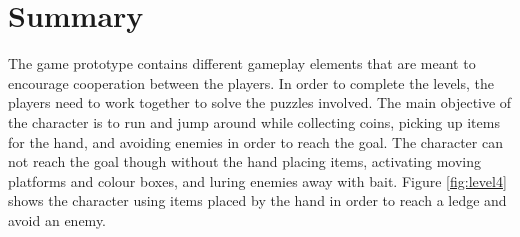 \section{Summary}
The game prototype contains different gameplay elements that are meant to encourage cooperation between the players. In order to complete the levels, the players need to work together to solve the puzzles involved. The main objective of the character is to run and jump around while collecting coins, picking up items for the hand, and avoiding enemies in order to reach the goal. The character can not reach the goal though without the hand placing items, activating moving platforms and colour boxes, and luring enemies away with bait. Figure \ref{fig:level4} shows the character using items placed by the hand in order to reach a ledge and avoid an enemy.

